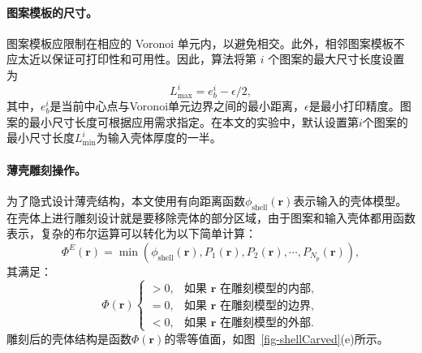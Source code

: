 \paragraph{图案模板的尺寸。}
图案模板应限制在相应的 Voronoi 单元内，以避免相交。此外，相邻图案模板不应太近以保证可打印性和可用性。因此，算法将第 $i$ 个图案的最大尺寸长度设置为
\begin{equation}
	L_{\max}^i=e^i_b-\epsilon/2,
\end{equation}
其中，$e^i_b$是当前中心点与Voronoi单元边界之间的最小距离，$\epsilon$是最小打印精度。图案的最小尺寸长度可根据应用需求指定。在本文的实验中，默认设置第$i$个图案的最小尺寸长度$L_{\min}^i$为输入壳体厚度的一半。

\paragraph{薄壳雕刻操作。}
为了隐式设计薄壳结构，本文使用有向距离函数$\phi_{\mathrm{shell}}(\mathbf{r})$表示输入的壳体模型。在壳体上进行雕刻设计就是要移除壳体的部分区域，由于图案和输入壳体都用函数表示，复杂的布尔运算可以转化为以下简单计算：
\begin{equation}
	\Phi^{E}(\mathbf{r})=\min(\phi_{\mathrm{shell}}(\mathbf{r}), P_1(\mathbf{r}), P_2(\mathbf{r}),\cdots,P_{N_p}(\mathbf{r})),
\end{equation} 
其满足：
\begin{equation}
	\Phi(\mathbf{r})
	\begin{cases}
		>0, & \text{如果 $\mathbf{r}$ 在雕刻模型的内部},\\
		=0, & \text{如果 $\mathbf{r}$ 在雕刻模型的边界},\\
		<0, & \text{如果 $\mathbf{r}$ 在雕刻模型的外部}.
	\end{cases}
\end{equation}
雕刻后的壳体结构是函数$\Phi(\mathbf{r})$的零等值面，如图~\ref{fig-shellCarved}(e)所示。

